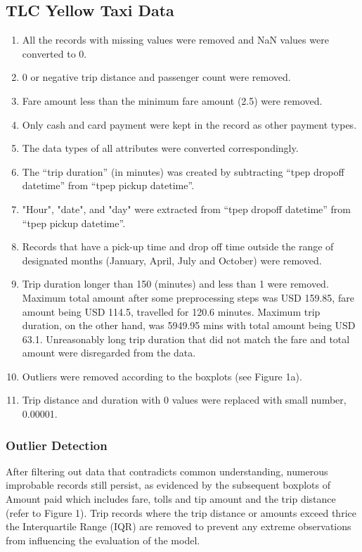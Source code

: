 \documentclass[11pt]{article}
\begin{document}
\subsection{TLC Yellow Taxi Data}
\begin{enumerate}
    \item All the records with missing values were removed and NaN values were converted to 0.
    \item 0 or negative trip distance and passenger count were removed.
    \item Fare amount less than the minimum fare amount (2.5) were removed.
    \item Only cash and card payment were kept in the record as other payment types.
    \item The data types of all attributes were converted correspondingly.
    \item The “trip duration” (in minutes) was created by subtracting “tpep dropoff datetime” from “tpep pickup datetime”.
    \item "Hour", "date", and "day" were extracted from “tpep dropoff datetime” from “tpep pickup datetime”.
    \item Records that have a pick-up time and drop off time outside the range of designated months (January, April, July and October) were removed.
    \item Trip duration longer than 150 (minutes) and less than 1 were removed. Maximum total amount after some preprocessing steps was USD 159.85, fare amount being USD 114.5, travelled for 120.6 minutes. Maximum trip duration, on the other hand, was 5949.95 mins with total amount being USD 63.1. Unreasonably long trip duration that did not match the fare and total amount were disregarded from the data.
    \item Outliers were removed according to the boxplots (see Figure 1a). 
    \item Trip distance and duration with 0 values were replaced with small number, 0.00001.
\end{enumerate}



\subsubsection{Outlier Detection}
After filtering out data that contradicts common understanding, numerous improbable records still persist, as evidenced by the subsequent boxplots of Amount paid which includes fare, tolls and tip amount and the trip distance (refer to Figure 1). Trip records where the trip distance or amounts exceed thrice the Interquartile Range (IQR) are removed to prevent any extreme observations from influencing the evaluation of the model. 
\end{document}
